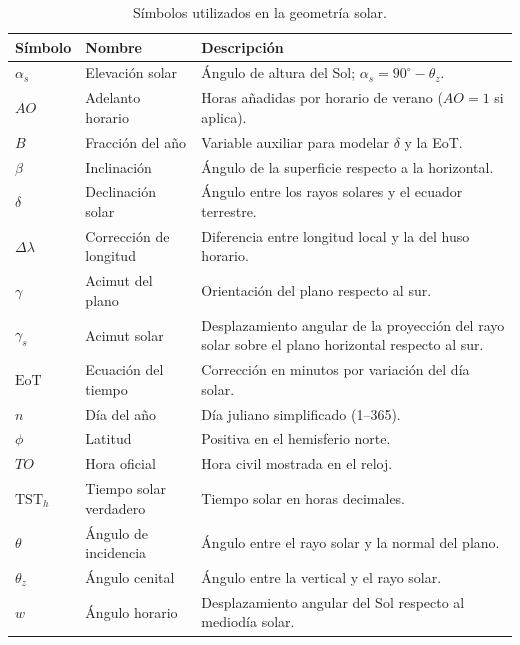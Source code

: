 \begin{table}[t]
\centering
\begin{tabular}{p{1.8cm} p{3.0cm} p{8.5cm}}
\hline
\textbf{Símbolo} & \textbf{Nombre} & \textbf{Descripción} \\
\hline
$\alpha_s$ & Elevación solar &
Ángulo de altura del Sol; $\alpha_s = 90^\circ - \theta_z$. \\[2mm]

$AO$ & Adelanto horario &
Horas añadidas por horario de verano ($AO=1$ si aplica). \\[2mm]

$B$ & Fracción del año &
Variable auxiliar para modelar $\delta$ y la EoT. \\[2mm]

$\beta$ & Inclinación &
Ángulo de la superficie respecto a la horizontal. \\[2mm]

$\delta$ & Declinación solar &
Ángulo entre los rayos solares y el ecuador terrestre. \\[2mm]

$\Delta\lambda$ & Corrección de longitud &
Diferencia entre longitud local y la del huso horario. \\[2mm]

$\gamma$ & Acimut del plano &
Orientación del plano respecto al sur. \\[2mm]

$\gamma_s$ & Acimut solar &
Desplazamiento angular de la proyección del rayo solar sobre el plano horizontal respecto al sur. \\[2mm]

$\mathrm{EoT}$ & Ecuación del tiempo &
Corrección en minutos por variación del día solar. \\[2mm]

$n$ & Día del año &
Día juliano simplificado (1–365). \\[2mm]

$\phi$ & Latitud &
Positiva en el hemisferio norte. \\[2mm]

$TO$ & Hora oficial &
Hora civil mostrada en el reloj. \\[2mm]

$\mathrm{TST}_h$ & Tiempo solar verdadero &
Tiempo solar en horas decimales. \\[2mm]

$\theta$ & Ángulo de incidencia &
Ángulo entre el rayo solar y la normal del plano. \\[2mm]

$\theta_z$ & Ángulo cenital &
Ángulo entre la vertical y el rayo solar. \\[2mm]

$w$ & Ángulo horario &
Desplazamiento angular del Sol respecto al mediodía solar. \\[2mm]
\hline
\end{tabular}
\caption{Símbolos utilizados en la geometría solar.}
\end{table}

